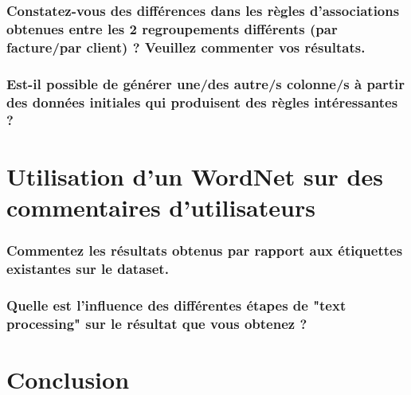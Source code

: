 \documentclass[a4paper]{article}
\begin{document}
\subsubsection*{Constatez-vous des différences dans les règles d'associations obtenues entre les 2 regroupements différents (par facture/par client) ? Veuillez commenter vos résultats.}

\subsubsection*{Est-il possible de générer une/des autre/s colonne/s à partir des données initiales qui produisent des règles intéressantes ?}

\section{Utilisation d'un WordNet sur des commentaires d’utilisateurs}

\subsubsection*{Commentez les résultats obtenus par rapport aux étiquettes existantes sur le dataset.}

\subsubsection*{Quelle est l'influence des différentes étapes de "text processing" sur le résultat que vous obtenez ?}

\section{Conclusion}
\end{document}
